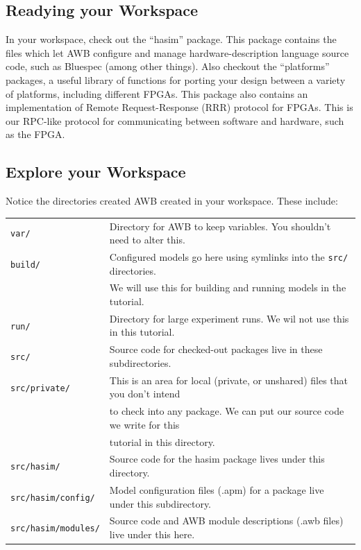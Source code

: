 \documentclass{article}
\begin{document}
\subsection{Readying your Workspace}

In your workspace, check out the ``hasim'' package. This package contains the files which let AWB configure and manage hardware-description language source code,
such as Bluespec (among other things). Also checkout the ``platforms'' packages, a useful library of functions for porting your design between a variety of
platforms, including different FPGAs. This package also contains an implementation of Remote Request-Response (RRR) protocol for FPGAs. This is our RPC-like
protocol for communicating between software and hardware, such as the FPGA.

\subsection{Explore your Workspace}

Notice the directories created AWB created in your workspace. These include:

\vspace{10pt}
\begin{tabular}{ll}
    \texttt{var/}                    & Directory for AWB to keep variables. You shouldn't need to alter this. \\
    \texttt{build/}                  & Configured models go here using symlinks into the \texttt{src/} directories.\\
                                     & We will use this for building and running models in the tutorial. \\
    \texttt{run/}                    & Directory for large experiment runs. We wil not use this in this tutorial.\\
    \texttt{src/}                    & Source code for checked-out packages live in these subdirectories. \\
    \texttt{src/private/}            & This is an area for local (private, or unshared) files that you don't intend \\
                                     & to check into any package. We can put our source code we write for this \\
                                     & tutorial in this directory. \\
    \texttt{src/hasim/}              & Source code for the hasim package lives under this directory. \\
    \texttt{src/hasim/config/}       & Model configuration files (.apm) for a package live under this subdirectory. \\
    \texttt{src/hasim/modules/}      & Source code and AWB module descriptions (.awb files) live under this here. \\
\end{tabular}
\end{document}
